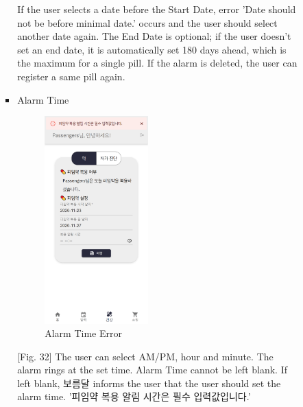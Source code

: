 \documentclass[conference]{IEEEtran}
\begin{document}
\begin{itemize}
\begin{enumerate}
\begin{enumerate}
\begin{itemize}
                If the user selects a date before the Start Date, error 'Date should not be before minimal date.' occurs and the user should select another date again. The End Date is optional; if the user doesn't set an end date, it is automatically set 180 days ahead, which is the maximum for a single pill. If the alarm is deleted, the user can register a same pill again.
                
                \item Alarm Time
                
                \begin{figure}[ht]
                \includegraphics[width=4cm, height=8cm, center]{pillTerr.png}
                \caption{Alarm Time Error}
                \label{fig32}
                \end{figure}
                [Fig. 32] The user can select AM/PM, hour and minute. The alarm rings at the set time. Alarm Time cannot be left blank. If left blank, 보름달 informs the user that the user should set the alarm time. '피임약 복용 알림 시간은 필수 입력값입니다.' 
                

\end{itemize}
\end{enumerate}
\end{enumerate}
\end{itemize}
\end{document}
